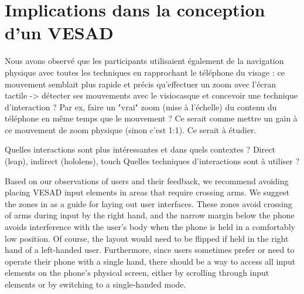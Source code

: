 



\section{Implications dans la conception d'un VESAD}
\label{sec:discussion_consequences}

Nous avons observé que les participants utilisaient également de la navigation physique avec toutes les techniques en rapprochant le téléphone du visage : ce mouvement semblait plus rapide et précis qu'effectuer un zoom avec l'écran tactile -> détecter ses mouvements avec le visiocasque et concevoir une technique d'interaction ? Par ex, faire un "vrai" zoom (mise à l'échelle) du contenu du téléphone en même temps que le mouvement ? Ce serait comme mettre un gain à ce mouvement de zoom physique (sinon c'est 1:1). Ce serait à étudier.

Quelles interactions sont plus intéressantes et dans quels contextes ? Direct (leap), indirect (hololens), touch
Quelles techniques d'interactions sont à utiliser ?

Based on our observations of users and their feedback, we recommend avoiding placing VESAD input elements in areas that require crossing arms. We suggest the zones in  as a guide for laying out user interfaces. These zones avoid crossing of arms during input by the right hand, and the narrow margin below the phone avoids interference with the user's body when the phone is held in a comfortably low position. Of course, the layout would need to be flipped if held in the right hand of a left-handed user. Furthermore, since users sometimes prefer or need to operate their phone with a single hand, there should be a way to access all input elements on the phone's physical screen, either by scrolling through input elements or by switching to a single-handed mode.


